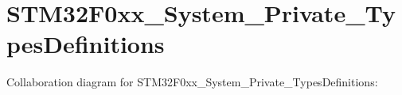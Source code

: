 \hypertarget{group___s_t_m32_f0xx___system___private___types_definitions}{}\section{S\+T\+M32\+F0xx\+\_\+\+System\+\_\+\+Private\+\_\+\+Types\+Definitions}
\label{group___s_t_m32_f0xx___system___private___types_definitions}
Collaboration diagram for S\+T\+M32\+F0xx\+\_\+\+System\+\_\+\+Private\+\_\+\+Types\+Definitions\+:

